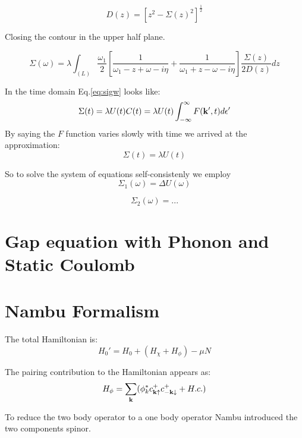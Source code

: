 \begin{equation}
D(z) =  \left[z^{2} - \Sigma(z)^{2} \right]^{\frac{1}{2}}
\end{equation}

Closing the contour in the upper half plane.

\begin{equation}
\label{eq:sigw}
\Sigma(\omega) = \lambda \int_{(L)} \frac{\omega_{1}}{2} \left[ \frac{1}{\omega_{1} - z + \omega - i\eta} 
+ \frac{1}{\omega_{1} + z - \omega - i\eta} \right] \frac{\Sigma(z)}{2D(z)} dz
\end{equation}

In the time domain Eq.\ref{eq:sigw} looks like:
%
\begin{equation}
\Sigma(t) = \lambda U(t) C(t) = \lambda U(t) \int_{-\infty}^{\infty}F({\bf k}',t)d\epsilon' 
\end{equation}
%
By saying the $F$ function varies slowly with time we arrived at the approximation:
%
\begin{equation}
\Sigma(t) = \lambda U(t)
\end{equation}

So to solve the system of equations self-consistenly we employ
%
\begin{equation}
\Sigma_{1}(\omega) = \Delta U(\omega)
\end{equation}

\begin{equation}
\Sigma_{2}(\omega) = ...
\end{equation}

\section{Gap equation with Phonon and Static Coulomb}
\section{Nambu Formalism}
The total Hamiltonian is:
%
\begin{equation}
H_{0}'= H_{0} + (H_{\chi} + H_{\phi}) - \mu N
\end{equation}
%

The pairing contribution to the Hamiltonian appears as:
%
\begin{equation}
H_{\phi} = \sum_{{\bf k}}(\phi^{*}_{k}c^{+}_{{\bf k}\uparrow}c^{+}_{-{\bf k}\downarrow}  + H.c. )
\end{equation}
%

To reduce the two body operator to a one body operator Nambu introduced the two components spinor.

